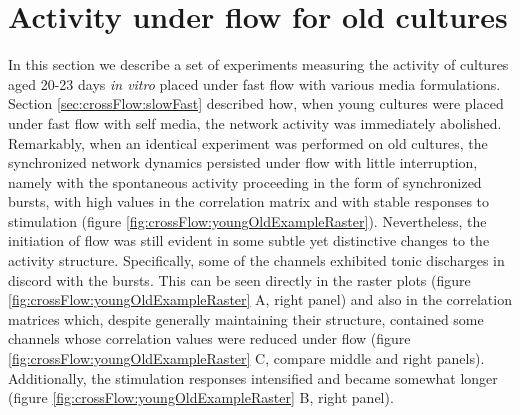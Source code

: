 \section{Activity under flow for old cultures}
\label{sec:crossFlow:oldSelf}
        In this section we describe a set of experiments measuring the activity of cultures aged 20-23 days \textit{in vitro} placed under fast flow with various media formulations. Section \ref{sec:crossFlow:slowFast} described how, when young cultures were placed under fast flow with self media, the network activity was immediately abolished. Remarkably, when an identical experiment was performed on old cultures, the synchronized network dynamics persisted under flow with little interruption, namely with the spontaneous activity proceeding in the form of synchronized bursts, with high values in the correlation matrix and with stable responses to stimulation (figure \ref{fig:crossFlow:youngOldExampleRaster}). Nevertheless, the initiation of flow was still evident in some subtle yet distinctive changes to the activity structure. Specifically, some of the channels exhibited tonic discharges in discord with the bursts. This can be seen directly in the raster plots (figure \ref{fig:crossFlow:youngOldExampleRaster} A, right panel) and also in the correlation matrices which, despite generally maintaining their structure, contained some channels whose correlation values were reduced under flow (figure \ref{fig:crossFlow:youngOldExampleRaster} C, compare middle and right panels). Additionally, the stimulation responses intensified and became somewhat longer (figure \ref{fig:crossFlow:youngOldExampleRaster} B, right panel).

